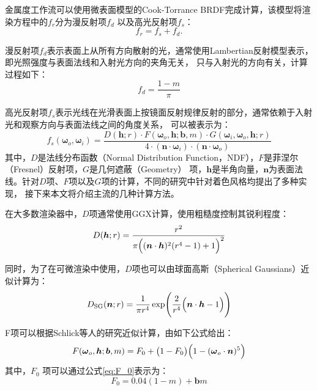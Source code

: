 金属度工作流可以使用微表面模型的Cook-Torrance BRDF完成计算，该模型将渲染方程中的$f_r$分为漫反射项$f_d$
以及高光反射项$f_s$：
\begin{equation}\label{eq:cook-torrance}
f_r=f_s+f_d.
\end{equation}

漫反射项$f_d$表示表面上从所有方向散射的光，通常使用Lambertian反射模型表示，即光照强度与表面法线和入射光方向的夹角无关，
只与入射光的方向有关，计算过程如下：
\begin{equation}\label{eq:lambertian}
f_d=\frac{1-m}{\pi}
\end{equation}

高光反射项$f_s$表示光线在光滑表面上按镜面反射规律反射的部分，通常依赖于入射光和观察方向与表面法线之间的角度关系，
可以被表示为：
\begin{equation}\label{eq:specular}
f_s({\boldsymbol{\omega}}_o,{\boldsymbol{\omega}}_i)=\frac{D({\boldsymbol{h}};r)\cdot F({\boldsymbol{\omega}}_o,{\boldsymbol{h}};{\boldsymbol{b}},m)\cdot G({\boldsymbol{\omega}}_i,{\boldsymbol{\omega}}_o,{\boldsymbol{h}};r)}
{4\cdot({\boldsymbol{n}}\cdot{\boldsymbol{\omega}}_i)\cdot({\boldsymbol{n}}\cdot{\boldsymbol{\omega}}_o)}
\end{equation}
其中，$D$是法线分布函数（Normal Distribution Function，NDF），$F$是菲涅尔（Fresnel）反射项，$G$是几何遮蔽（Geometry）
项，$\boldsymbol{h}$是半角向量，$\boldsymbol{n}$为表面法线。针对$D$项、$F$项以及$G$项的计算，不同的研究中针对着色风格均提出了多种实现，
接下来本文将介绍主流的几种计算方法。

在大多数渲染器中，$D$项通常使用GGX\cite{walter2007microfacet}计算，使用粗糙度控制其锐利程度：
\begin{equation}\label{eq:D_ggx}
D({\boldsymbol{h}};r)=\frac{r^2}{\pi\Bigl(({\boldsymbol{n}}\cdot{\boldsymbol{h}})^2(r^4-1)+1\Bigr)^2}
\end{equation}

同时，为了在可微渲染中使用，$D$项也可以由球面高斯（Spherical Gaussians）近似计算为：
\begin{equation}\label{eq:Dsg}
D_{\rm{SG}}({\boldsymbol{n}};r)=\frac{1}{\pi r^4}\exp\Biggl(\frac{2}{r^4}\Bigl({\boldsymbol{n}}\cdot{\boldsymbol{h}}-1\Bigr)\Biggr)
\end{equation}

F项可以根据Schlick等人\cite{schlick1994inexpensive}的研究近似计算，由如下公式给出：
\begin{equation}
  \label{eq:F}
  F({\boldsymbol{\omega}}_o,{\boldsymbol{h}};{\boldsymbol{b}},m)=F_0+\bigl(1-F_0\bigr)\Bigl(1-({\boldsymbol{\omega}}_o\cdot{\boldsymbol{n}})^5\Bigr)
\end{equation}
其中，$F_0$ 项可以通过公式\eqref{eq:F_0}表示为：
\begin{equation}
  \label{eq:F_0}
  F_0=0.04(1-m)+{\boldsymbol{b}}m
\end{equation}

